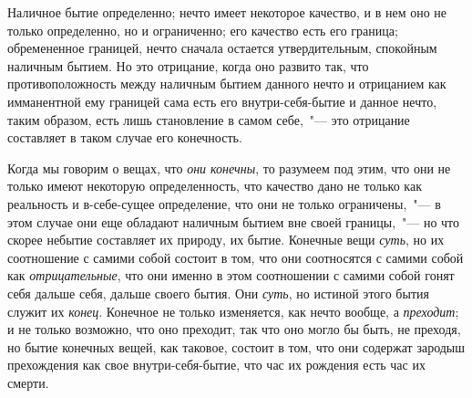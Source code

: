 Наличное бытие определенно; нечто имеет некоторое
качество, и в нем оно не только определенно, но и ограниченно;
его качество есть его граница; обремененное
границей, нечто сначала остается утвердительным,
спокойным наличным бытием. Но это отрицание, когда
оно развито так, что противоположность между наличным
бытием данного нечто и отрицанием как имманентной ему
границей сама есть его внутри-себя-бытие и данное нечто,
таким образом, есть лишь становление в самом
себе,~"--- это отрицание составляет в таком случае его конечность.

Когда мы говорим о вещах, что \emph{они конечны}, то разумеем
под этим, что они не только имеют некоторую
определенность, что качество дано не только как реальность
и в-себе-сущее определение, что они не только
ограничены,~"--- в этом случае они еще обладают наличным
бытием вне своей границы,~"--- но что скорее небытие составляет
их природу, их бытие. Конечные вещи \emph{суть}, но
их соотношение с самими собой состоит в том, что они
соотносятся с самими собой как \emph{отрицательные}, что они
именно в этом соотношении с самими собой гонят себя
дальше себя, дальше своего бытия. Они \emph{суть}, но истиной
этого бытия служит их \emph{конец}. Конечное не только изменяется,
как нечто вообще, а \emph{преходит}; и не только возможно,
что оно преходит, так что оно могло бы быть,
не преходя, но бытие конечных вещей, как таковое, состоит
в том, что они содержат зародыш прехождения как
свое внутри-себя-бытие, что час их рождения есть час
их смерти.


